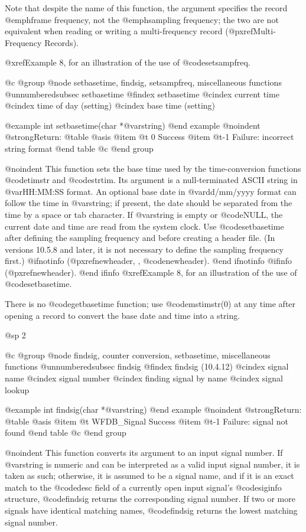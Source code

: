 {{{{{{{{Note that despite the name of this function, the argument specifies the record
@emph{frame} frequency, not the @emph{sampling} frequency; the two are not
equivalent when reading or writing a multi-frequency record
(@pxref{Multi-Frequency Records}).

@xref{Example 8}, for an illustration of the use of @code{setsampfreq}.

@c @group
@node     setbasetime, findsig, setsampfreq, miscellaneous functions
@unnumberedsubsec setbasetime
@findex setbasetime
@cindex current time
@cindex time of day (setting)
@cindex base time (setting)

@example
int setbasetime(char *@var{string})
@end example
@noindent
@strong{Return:}
@table @asis
@item @t{ 0}
Success
@item @t{-1}
Failure: incorrect string format
@end table
@c @end group

@noindent
This function sets the base time used by the time-conversion functions
@code{timstr} and @code{strtim}.  Its argument is a null-terminated
ASCII string in @var{HH:MM:SS} format.  An optional base date in
@var{dd/mm/yyyy} format can follow the time in @var{string}; if present,
the date should be separated from the time by a space or tab character.  If
@var{string} is empty or @code{NULL}, the current date and time are read
from the system clock.  Use @code{setbasetime} after defining the sampling
frequency and before creating a header file.  (In versions 10.5.8 and later,
it is not necessary to define the sampling frequency first.)
@ifnotinfo
(@pxref{newheader, , @code{newheader}}).
@end ifnotinfo
@ifinfo
(@pxref{newheader}).
@end ifinfo
@xref{Example 8}, for an illustration of the use of @code{setbasetime}.

There is no @code{getbasetime} function;  use @code{mstimstr(0)} at any
time after opening a record to convert the base date and time into a string.

@sp 2

@c @group
@node     findsig, counter conversion, setbasetime, miscellaneous functions
@unnumberedsubsec findsig
@findex findsig (10.4.12)
@cindex signal name
@cindex signal number
@cindex finding signal by name
@cindex signal lookup

@example
int findsig(char *@var{string})
@end example
@noindent
@strong{Return:}
@table @asis
@item @t{ WFDB_Signal}
Success
@item @t{-1}
Failure: signal not found
@end table
@c @end group

@noindent
This function converts its argument to an input signal number.
If @var{string} is numeric and can be interpreted as a valid
input signal number, it is taken as such;  otherwise, it is
assumed to be a signal name, and if it is an exact match to the
@code{desc} field of a currently open input signal's @code{siginfo}
structure, @code{findsig} returns the corresponding signal number.
If two or more signals have identical matching names, @code{findsig}
returns the lowest matching signal number.


}}}}}}}}
